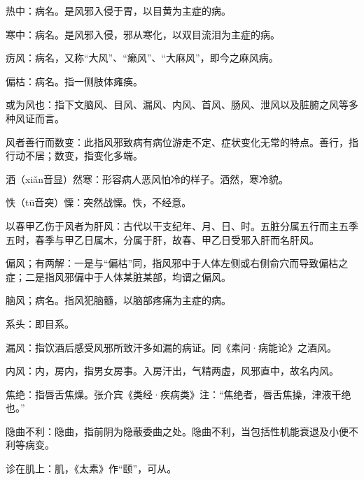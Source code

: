\documentclass[draft,12pt]{ctexbook}
\begin{document}
\begin{jiaozhu}
	\item 热中：病名。是风邪入侵于胃，以目黄为主症的病。
	\item 寒中：病名。是风邪入侵，邪从寒化，以双目流泪为主症的病。
	\item 疠风：病名，又称“大风”、“癞风”、“大麻风”，即今之麻风病。
	\item 偏枯：病名。指一侧肢体瘫痪。
	\item 或为风也：指下文脑风、目风、漏风、内风、首风、肠风、泄风以及脏腑之风等多种风证而言。
	\item 风者善行而数变：此指风邪致病有病位游走不定、症状变化无常的特点。善行，指行动不居；数变，指变化多端。
	\item 洒（xiǎn音显）然寒：形容病人恶风怕冷的样子。洒然，寒冷貌。
	\item 怢（tū音突）慄：突然战慄。怢，不经意。
	\item 以春甲乙伤于风者为肝风：古代以干支纪年、月、日、时。五脏分属五行而主五季五时，春季与甲乙日属木，分属于肝，故春、甲乙日受邪入肝而名肝风。
	\item 偏风；有两解：一是与“偏枯”同，指风邪中于人体左侧或右侧俞穴而导致偏枯之症；二是指风邪偏中于人体某脏某部，均谓之偏风。
	\item 脑风；病名。指风犯脑髓，以脑部疼痛为主症的病。
	\item 系头：即目系。
	\item 漏风：指饮酒后感受风邪所致汗多如漏的病证。同《素问·病能论》之酒风。
	\item 内风：内，房内，指男女房事。入房汗出，气精两虚，风邪直中，故名内风。
	\item 焦绝：指唇舌焦燥。张介宾《类经·疾病类》注：“焦绝者，唇舌焦操，津液干绝也。”
	\item 隐曲不利：隐曲，指前阴为隐蔽委曲之处。隐曲不利，当包括性机能衰退及小便不利等病变。
	\item 诊在肌上：肌，《太素》作“颐”，可从。
\end{jiaozhu}


\end{document}
